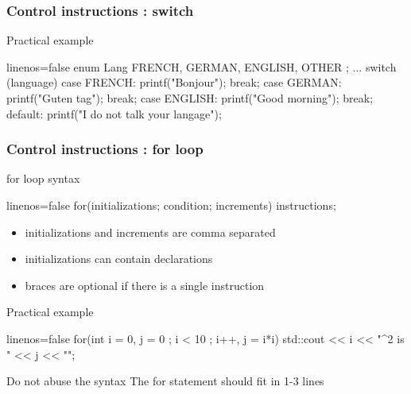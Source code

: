 \begin{frame}[fragile]
  \frametitle{Control instructions : switch}
  \begin{exampleblock}{Practical example}
    \begin{cppcode*}{linenos=false}
      enum Lang { FRENCH, GERMAN, ENGLISH, OTHER };
      ...
      switch (language) {
      case FRENCH:
        printf("Bonjour");
        break;
      case GERMAN:
        printf("Guten tag");
        break;
      case ENGLISH:
        printf("Good morning");
        break;
      default:
        printf("I do not talk your langage");
      }
    \end{cppcode*}
  \end{exampleblock}
\end{frame}

\begin{frame}[fragile]
  \frametitle{Control instructions : for loop}
  \begin{block}{for loop syntax}
    \begin{cppcode*}{linenos=false}
      for(initializations; condition; increments) {
        instructions;
      }
    \end{cppcode*}
    \vspace{-0.5cm}
    \begin{itemize}
      \item initializations and increments are comma separated
      \item initializations can contain declarations
      \item braces are optional if there is a single instruction
    \end{itemize}
  \end{block}
  \pause
  \begin{exampleblock}{Practical example}
    \begin{cppcode*}{linenos=false}
      for(int i = 0, j = 0 ; i < 10 ; i++, j = i*i) {
        std::cout << i << "^2 is " << j << "\n";
      }
    \end{cppcode*}
  \end{exampleblock}
  \pause
  \begin{alertblock}{Do not abuse the syntax}
    The for statement should fit in 1-3 lines
  \end{alertblock}
\end{frame}


